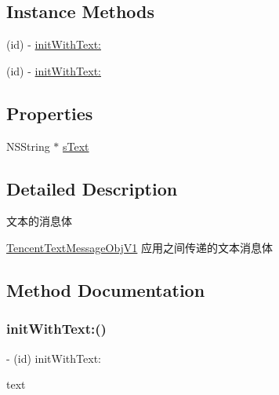 \subsection*{Instance Methods}
\begin{DoxyCompactItemize}
\item 
(id) -\/ \mbox{\hyperlink{interface_tencent_text_message_obj_v1_aa5a6585b478714ee95b9a3f9b5ca008c}{init\+With\+Text\+:}}
\item 
(id) -\/ \mbox{\hyperlink{interface_tencent_text_message_obj_v1_aa5a6585b478714ee95b9a3f9b5ca008c}{init\+With\+Text\+:}}
\end{DoxyCompactItemize}
\subsection*{Properties}
\begin{DoxyCompactItemize}
\item 
N\+S\+String $\ast$ \mbox{\hyperlink{interface_tencent_text_message_obj_v1_ab1064daef652b66656d0d97f35528205}{s\+Text}}
\end{DoxyCompactItemize}


\subsection{Detailed Description}
文本的消息体 

\mbox{\hyperlink{interface_tencent_text_message_obj_v1}{Tencent\+Text\+Message\+Obj\+V1}} 应用之间传递的文本消息体 

\subsection{Method Documentation}
\mbox{\label{interface_tencent_text_message_obj_v1_aa5a6585b478714ee95b9a3f9b5ca008c}} 
\subsubsection{\texorpdfstring{init\+With\+Text\+:()}{initWithText:()}\hspace{0.1cm}{\footnotesize\ttfamily [1/2]}}
{\footnotesize\ttfamily -\/ (id) init\+With\+Text\+: \begin{DoxyParamCaption}\item[{(N\+S\+String $\ast$)}]{text }\end{DoxyParamCaption}}

